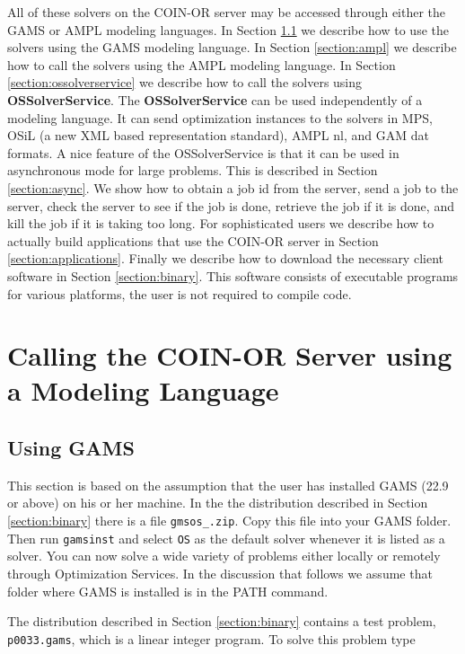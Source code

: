 \documentclass[11pt]{article}
\renewcommand{\{}{{\char"7B}}
\renewcommand{\}}{{\char"7D}}
\renewcommand{\^}{{\char"0D}}
\renewcommand{\'}{{\char"0D}}
\begin{document}
All of these solvers on the COIN-OR server may be accessed through either the GAMS or AMPL modeling languages.   In Section \ref{section:gams} we describe how to use the solvers using the GAMS modeling language. In Section \ref{section:ampl} we describe how to call the solvers using the AMPL modeling language.  In Section \ref{section:ossolverservice} we describe how to call the solvers using {\bf OSSolverService}.  The {\bf OSSolverService}  can be used independently of a modeling language.   It can send optimization instances to the solvers in MPS, OSiL (a new XML based representation standard), AMPL nl, and GAM dat formats. A nice feature of the OSSolverService is that it can be used in asynchronous mode for large problems.  This is described in Section \ref{section:async}. We show how to obtain a job id from the server, send a job to the server, check the server to see if the job is done, retrieve the job if it is done, and kill the job if it is taking too long. For sophisticated users we describe how to actually build applications that use the COIN-OR server in Section  \ref{section:applications}.  Finally we   describe how to download the necessary client software in Section \ref{section:binary}.    This software consists of executable programs for various platforms, the user is not required to compile code. 

\section{Calling the COIN-OR  Server using a Modeling Language}\label{section:modellanguage}


\subsection{Using GAMS}\label{section:gams}

This section is based on the assumption that the user has installed GAMS (22.9 or above) on his or her machine.   In the  the distribution described in Section \ref{section:binary}  there is a file {\tt gmsos\_.zip}. Copy this file into your GAMS folder. Then run {\tt gamsinst} and select {\tt OS}  as the default solver whenever it is listed as a solver.   You can now solve  a wide variety of  problems either locally or remotely through Optimization Services. In the discussion that follows we assume that folder where GAMS is installed is in the PATH command.


The distribution described in Section \ref{section:binary} contains a test problem, {\tt p0033.gams}, which is a linear integer program. To solve this problem type
\end{document}
